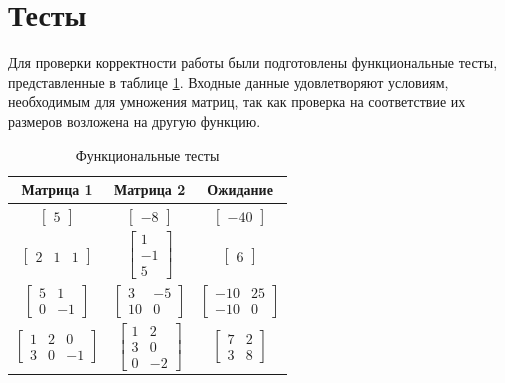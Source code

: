 \documentclass[12pt, a4paper]{report}
\begin{document}
	\newpage

	\section{Тесты}
	Для проверки корректности работы были подготовлены функциональные тесты, представленные в таблице \ref{unit-tests}. Входные данные удовлетворяют условиям, необходимым для умножения матриц, так как проверка на соответствие их размеров возложена на другую функцию.

	\begin{table}[ht!]
		\caption{Функциональные тесты}
		\label{unit-tests}
		\begin{center}
			\begin{tabular}{|c|c|c|}
			\hline
			\bf{Матрица 1} & \bf{Матрица 2} & \bf{Ожидание}\\\hline
			
			$\begin{bmatrix}5\end{bmatrix}$ &
			$\begin{bmatrix}-8\end{bmatrix}$ &
			$\begin{bmatrix}-40\end{bmatrix}$\\\hline
			
			$\begin{bmatrix}2 & 1 & 1\end{bmatrix}$ &
			$\begin{bmatrix}1\\-1\\5\end{bmatrix}$ &
			$\begin{bmatrix}6\end{bmatrix}$\\\hline
			
			$\begin{bmatrix}5 & 1\\0 & -1\end{bmatrix}$ &
			$\begin{bmatrix}3 & -5\\10 & 0\end{bmatrix}$ &
			$\begin{bmatrix}-10 & 25\\-10 & 0\end{bmatrix}$\\\hline
			
			$\begin{bmatrix}1 & 2 & 0\\3 & 0 & -1\end{bmatrix}$ &
			$\begin{bmatrix}1 & 2\\3 & 0\\0 & -2\end{bmatrix}$ &
			$\begin{bmatrix}7 & 2\\3 & 8\end{bmatrix}$\\\hline
			

\end{tabular}
\end{center}
\end{table}
\end{document}
